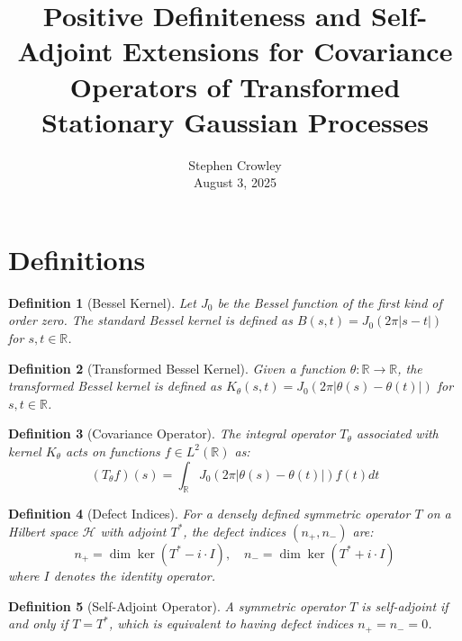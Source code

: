 \documentclass{article}
\newcommand{\tmaffiliation}[1]{\\ #1}
\newtheorem{definition}{Definition}
\begin{document}
\title{Positive Definiteness and Self-Adjoint Extensions for Covariance
Operators of Transformed Stationary Gaussian Processes}

\author{
  Stephen Crowley
  \tmaffiliation{August 3, 2025}
}

\maketitle

{\tableofcontents}

\section{Definitions}

\begin{definition}
  [Bessel Kernel] Let $J_0$ be the Bessel function of the first kind of order
  zero. The standard Bessel kernel is defined as $B (s, t) = J_0  (2 \pi |s -
  t|)$ for $s, t \in \mathbb{R}$.
\end{definition}

\begin{definition}
  [Transformed Bessel Kernel] Given a function $\theta : \mathbb{R} \to
  \mathbb{R}$, the transformed Bessel kernel is defined as $K_{\theta} (s, t)
  = J_0  (2 \pi | \theta (s) - \theta (t) |)$ for $s, t \in \mathbb{R}$.
\end{definition}

\begin{definition}
  [Covariance Operator] The integral operator $T_{\theta}$ associated with
  kernel $K_{\theta}$ acts on functions $f \in L^2 (\mathbb{R})$ as:
  \begin{equation}
    (T_{\theta} f) (s) = \int_{\mathbb{R}} J_0  (2 \pi | \theta (s) - \theta
    (t) |) f (t) dt
  \end{equation}
\end{definition}

\begin{definition}
  [Defect Indices] For a densely defined symmetric operator $T$ on a Hilbert
  space $\mathcal{H}$ with adjoint $T^{\ast}$, the defect indices $(n_+, n_-)$
  are:
  \begin{equation}
    n_+ = \dim \ker (T^{\ast} - i \cdot I), \quad n_- = \dim \ker (T^{\ast} +
    i \cdot I)
  \end{equation}
  where $I$ denotes the identity operator.
\end{definition}

\begin{definition}
  [Self-Adjoint Operator] A symmetric operator $T$ is self-adjoint if and only
  if $T = T^{\ast}$, which is equivalent to having defect indices $n_+ = n_- =
  0$.
\end{definition}
\end{document}
